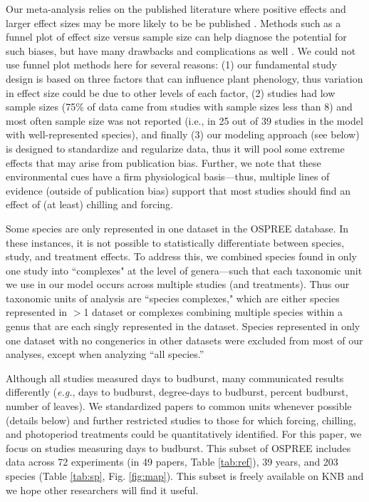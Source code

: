 \documentclass{article}
\begin{document}
\par Our meta-analysis relies on the published literature where positive effects and larger effect sizes may be more likely to be be published \emph{\citep{Kicinski2013}}. Methods such as a funnel plot of effect size versus sample size can help diagnose the potential for such biases, but have many drawbacks and complications as well \emph{\citep{Gurevitch1992,Gurevitch1999,Lin2018}}. We could not use funnel plot methods here for several reasons: (1) our fundamental study design is based on three factors that can influence plant phenology, thus variation in effect size could be due to other levels of each factor, (2) studies had low sample sizes (75\% of data came from studies with sample sizes less than 8) and most often sample size was not reported (i.e., in 25 out of 39 studies in the model with well-represented species), and finally (3) our modeling approach (see below) is designed to standardize and regularize data, thus it will pool some extreme effects that may arise from publication bias. Further, we note that these environmental cues have a firm physiological basis---thus, multiple lines of evidence (outside of publication bias) support that most studies should find an effect of (at least) chilling and forcing. 

\par Some species are only represented in one dataset in the OSPREE database. In these instances, it is not possible to statistically differentiate between species, study, and treatment effects. To address this, we combined species found in only one study into ``complexes" at the level of genera---such that each taxonomic unit we use in our model occurs across multiple studies (and treatments). Thus our taxonomic units of analysis are ``species complexes," which are either species represented in $>$1 dataset or complexes combining multiple species within a genus that are each singly represented in the dataset. Species represented in only one dataset with no congenerics in other datasets were excluded from most of our analyses, except when analyzing ``all species.''

\par Although all studies measured days to budburst, many communicated results differently (\emph{e.g.}, days to budburst, degree-days to budburst, percent budburst, number of leaves). We standardized papers to common units whenever possible (details below) and further restricted studies to those for which forcing, chilling, and photoperiod treatments could be quantitatively identified. For this paper, we focus on studies measuring days to budburst. This subset of OSPREE includes data across 72 experiments (in 49 papers, Table \ref{tab:ref}), 39 years, and 203 species (Table \ref{tab:sp}, Fig. \ref{fig:map}). This subset is freely available on KNB \emph{\citep{wolkovich2019}} and we hope other researchers will find it useful. 
\end{document}
